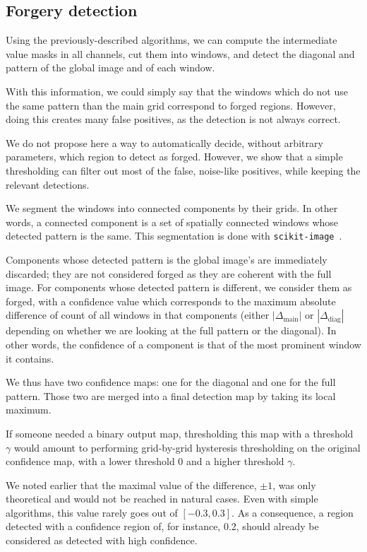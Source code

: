 \documentclass{ipol}
\begin{document}
\subsection{Forgery detection}
Using the previously-described algorithms, we can compute the intermediate value masks in all channels, cut them into windows, and detect the diagonal and pattern of the global image and of each window.

With this information, we could simply say that the windows which do not use the same pattern than the main grid correspond to forged regions. However, doing this creates many false positives, as the detection is not always correct.

We do not propose here a way to automatically decide, without arbitrary parameters, which region to detect as forged. However, we show that a simple thresholding can filter out most of the false, noise-like positives, while keeping the relevant detections.

We segment the windows into connected components by their grids. In other words, a connected component is a set of spatially connected windows whose detected pattern is the same.
This segmentation is done with \texttt{scikit-image}~\cite{skimage}.

Components whose detected pattern is the global image's are immediately discarded; they are not considered forged as they are coherent with the full image.
For components whose detected pattern is different, we consider them as forged, with a confidence value which corresponds to the maximum absolute difference of count of all windows in that components (either $|\Delta_{\mathrm{main}}|$ or $|\Delta_{\mathrm{diag}}|$ depending on whether we are looking at the full pattern or the diagonal). In other words, the confidence of a component is that of the most prominent window it contains.

We thus have two confidence maps: one for the diagonal and one for the full pattern. Those two are merged into a final detection map by taking its local maximum.

If someone needed a binary output map, thresholding this map with a threshold $\gamma$ would amount to performing grid-by-grid hysteresis thresholding on the original confidence map, with a lower threshold 0 and a higher threshold $\gamma$.

We noted earlier that the maximal value of the difference, $\pm1$, was only theoretical and would not be reached in natural cases. Even with simple algorithms, this value rarely goes out of $[-0.3, 0.3]$. As a consequence, a region detected with a confidence region of, for instance, 0.2, should already be considered as detected with high confidence.
\end{document}
